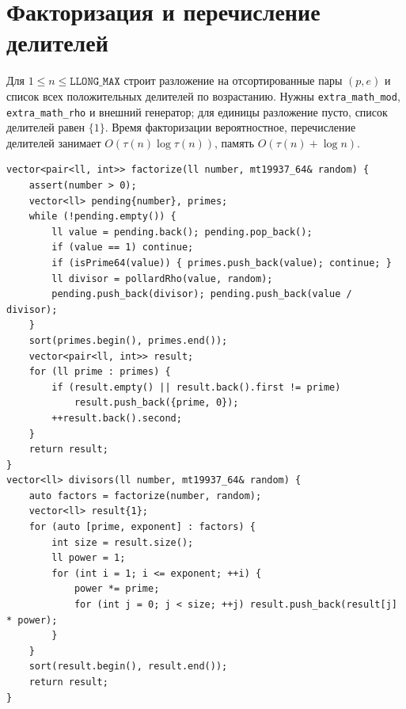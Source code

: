 \section{Факторизация и перечисление делителей}
Для $1\le n\le\texttt{LLONG\_MAX}$ строит разложение на отсортированные пары $(p,e)$ и список всех положительных делителей по возрастанию.
Нужны \texttt{extra\_math\_mod}, \texttt{extra\_math\_rho} и внешний генератор; для единицы разложение пусто, список делителей равен $\{1\}$.
Время факторизации вероятностное, перечисление делителей занимает $O(\tau(n)\log\tau(n))$, память $O(\tau(n)+\log n)$.
\begin{lstlisting}[name=extra_math_factor]
vector<pair<ll, int>> factorize(ll number, mt19937_64& random) {
    assert(number > 0);
    vector<ll> pending{number}, primes;
    while (!pending.empty()) {
        ll value = pending.back(); pending.pop_back();
        if (value == 1) continue;
        if (isPrime64(value)) { primes.push_back(value); continue; }
        ll divisor = pollardRho(value, random);
        pending.push_back(divisor); pending.push_back(value / divisor);
    }
    sort(primes.begin(), primes.end());
    vector<pair<ll, int>> result;
    for (ll prime : primes) {
        if (result.empty() || result.back().first != prime)
            result.push_back({prime, 0});
        ++result.back().second;
    }
    return result;
}
vector<ll> divisors(ll number, mt19937_64& random) {
    auto factors = factorize(number, random);
    vector<ll> result{1};
    for (auto [prime, exponent] : factors) {
        int size = result.size();
        ll power = 1;
        for (int i = 1; i <= exponent; ++i) {
            power *= prime;
            for (int j = 0; j < size; ++j) result.push_back(result[j] * power);
        }
    }
    sort(result.begin(), result.end());
    return result;
}
\end{lstlisting}
%

